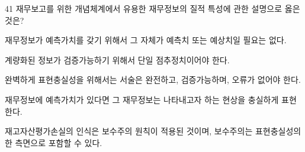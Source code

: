 \begin{question}{41}
재무보고를 위한 개념체계에서 유용한 재무정보의 질적 특성에 관한 설명으로 옳은 것은?
\begin{choices}
  \item 재무정보가 예측가치를 갖기 위해서 그 자체가 예측치 또는 예상치일 필요는 없다.
  \item 계량화된 정보가 검증가능하기 위해서 단일 점추정치이어야 한다.
  \item 완벽하게 표현충실성을 위해서는 서술은 완전하고, 검증가능하며, 오류가 없어야 한다.
  \item 재무정보에 예측가치가 있다면 그 재무정보는 나타내고자 하는 현상을 충실하게 표현한다.
  \item 재고자산평가손실의 인식은 보수주의 원칙이 적용된 것이며, 보수주의는 표현충실성의 한 측면으로 포함할 수 있다.
\end{choices}
\end{question}
